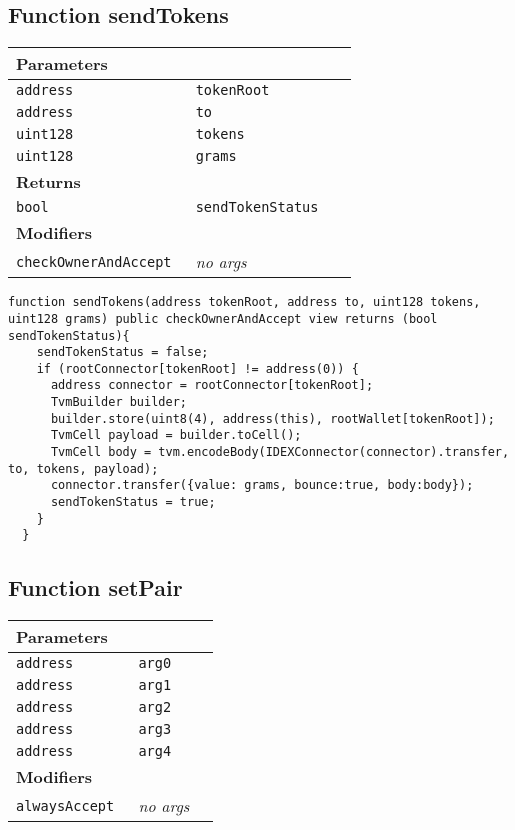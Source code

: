 \subsection{Function sendTokens}


\ifsoltables
\noindent\begin{tabular}{|l|l|p{5cm}|}\hline
\multicolumn{3}{|l|}{\bf Parameters}\\\hline
\tt address & \tt tokenRoot &\\\hline
\tt address & \tt to &\\\hline
\tt uint128 & \tt tokens &\\\hline
\tt uint128 & \tt grams &\\\hline
\multicolumn{3}{|l|}{\bf Returns}\\\hline
\tt bool & \tt sendTokenStatus &\\\hline
\multicolumn{3}{|l|}{\bf Modifiers}\\\hline
\tt checkOwnerAndAccept & {\em no args} &\\\hline
\end{tabular}
\fi



\begin{lstlisting}[firstnumber=399]
  function sendTokens(address tokenRoot, address to, uint128 tokens, uint128 grams) public checkOwnerAndAccept view returns (bool sendTokenStatus){
    sendTokenStatus = false;
    if (rootConnector[tokenRoot] != address(0)) {
      address connector = rootConnector[tokenRoot];
      TvmBuilder builder;
      builder.store(uint8(4), address(this), rootWallet[tokenRoot]);
      TvmCell payload = builder.toCell();
      TvmCell body = tvm.encodeBody(IDEXConnector(connector).transfer, to, tokens, payload);
      connector.transfer({value: grams, bounce:true, body:body});
      sendTokenStatus = true;
    }
  }
\end{lstlisting}

\subsection{Function setPair}


\ifsoltables
\noindent\begin{tabular}{|l|l|p{5cm}|}\hline
\multicolumn{3}{|l|}{\bf Parameters}\\\hline
\tt address & \tt arg0 &\\\hline
\tt address & \tt arg1 &\\\hline
\tt address & \tt arg2 &\\\hline
\tt address & \tt arg3 &\\\hline
\tt address & \tt arg4 &\\\hline
\multicolumn{3}{|l|}{\bf Modifiers}\\\hline
\tt alwaysAccept & {\em no args} &\\\hline
\end{tabular}
\fi



